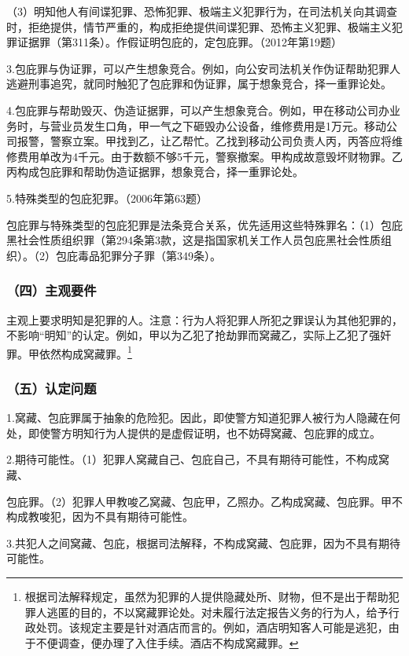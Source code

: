 （3）明知他人有间谍犯罪、恐怖犯罪、极端主义犯罪行为，在司法机关向其调查时，拒绝提供，情节严重的，构成拒绝提供间谍犯罪、恐怖主义犯罪、极端主义犯罪证据罪（第311条）。作假证明包庇的，定包庇罪。（2012年第19题）

3.包庇罪与伪证罪，可以产生想象竞合。例如，向公安司法机关作伪证帮助犯罪人逃避刑事追究，就同时触犯了包庇罪和伪证罪，属于想象竞合，择一重罪论处。

4.包庇罪与帮助毁灭、伪造证据罪，可以产生想象竞合。例如，甲在移动公司办业务时，与营业员发生口角，甲一气之下砸毁办公设备，维修费用是1万元。移动公司报警，警察立案。甲找到乙，让乙帮忙。乙找到移动公司负责人丙，丙答应将维修费用单改为4千元。由于数额不够5千元，警察撤案。甲构成故意毁坏财物罪。乙丙构成包庇罪和帮助伪造证据罪，想象竞合，择一重罪论处。

5.特殊类型的包庇犯罪。（2006年第63题）

包庇罪与特殊类型的包庇犯罪是法条竞合关系，优先适用这些特殊罪名：（1）包庇黑社会性质组织罪（第294条第3款，这是指国家机关工作人员包庇黑社会性质组织）。（2）包庇毒品犯罪分子罪（第349条）。

\subsubsection*{（四）主观要件}

主观上要求明知是犯罪的人。注意：行为人将犯罪人所犯之罪误认为其他犯罪的，不影响“明知”的认定。例如，甲以为乙犯了抢劫罪而窝藏乙，实际上乙犯了强奸罪。甲依然构成窝藏罪。\footnote{根据司法解释规定，虽然为犯罪的人提供隐藏处所、财物，但不是出于帮助犯罪人逃匿的目的，不以窝藏罪论处。对未履行法定报告义务的行为人，给予行政处罚。该规定主要是针对酒店而言的。例如，酒店明知客人可能是逃犯，由于不便调查，便办理了入住手续。酒店不构成窝藏罪。}

\subsubsection*{（五）认定问题}

1.窝藏、包庇罪属于抽象的危险犯。因此，即使警方知道犯罪人被行为人隐藏在何处，即使警方明知行为人提供的是虚假证明，也不妨碍窝藏、包庇罪的成立。

2.期待可能性。（1）犯罪人窝藏自己、包庇自己，不具有期待可能性，不构成窝藏、

包庇罪。（2）犯罪人甲教唆乙窝藏、包庇甲，乙照办。乙构成窝藏、包庇罪。甲不构成教唆犯，因为不具有期待可能性。

3.共犯人之间窝藏、包庇，根据司法解释，不构成窝藏、包庇罪，因为不具有期待可能性。


